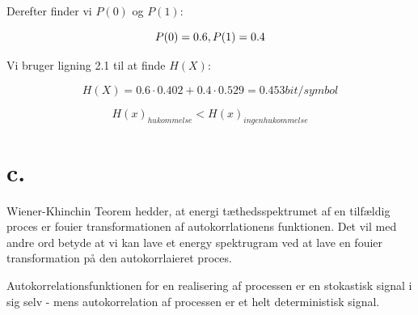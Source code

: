 Derefter finder vi $P(0)$ og $P(1)$:

\begin{equation}
P(0) = 0.6 \\,\\P(1) = 0.4
\end{equation}

Vi bruger ligning 2.1 til at finde $H(X)$:

 \begin{equation}
H(X) = 0.6\cdot 0.402+0.4 \cdot 0.529 = 0.453 bit/symbol
\end{equation} 



\begin{equation}
H(x)_{hukommelse}<H(x)_{ingen hukommelse}
\end{equation}



\section{c.}

Wiener-Khinchin Teorem hedder, at energi tæthedsspektrumet af en tilfældig proces er fouier transformationen af autokorrlationens funktionen. Det vil med andre ord betyde at vi kan lave et energy spektrugram ved at lave en fouier transformation på den autokorrlaieret proces.
 
Autokorrelationsfunktionen for en realisering af processen er en stokastisk signal i sig selv - mens autokorrelation af processen er et helt deterministisk signal.





